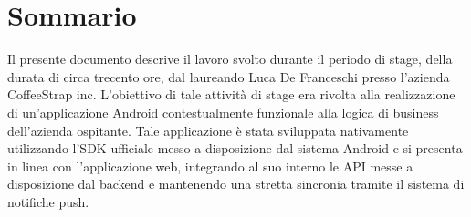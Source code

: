 
\cleardoublepage
{}
{}
\begingroup
\let\clearpage\relax
\let\cleardoublepage\relax
\let\cleardoublepage\relax

\chapter*{Sommario}

Il presente documento descrive il lavoro svolto durante il periodo di stage, della durata di circa trecento ore, dal laureando Luca De Franceschi presso l'azienda CoffeeStrap inc.
L'obiettivo di tale attività di stage era rivolta alla realizzazione di un'applicazione Android contestualmente funzionale alla logica di business dell'azienda ospitante. Tale applicazione è stata sviluppata nativamente utilizzando l'SDK ufficiale messo a disposizione dal sistema Android e si presenta in linea con l'applicazione web, integrando al suo interno le API messe a disposizione dal backend e mantenendo una stretta sincronia tramite il sistema di notifiche push. 
%
%

\endgroup			

\vfill

